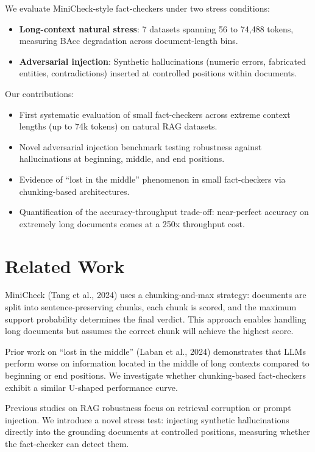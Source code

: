 \documentclass{article}
\begin{document}
We evaluate MiniCheck-style fact-checkers under two stress conditions:
\begin{itemize}
    \item \textbf{Long-context natural stress}: 7 datasets spanning 56 to 74,488 tokens, measuring BAcc degradation across document-length bins.
    \item \textbf{Adversarial injection}: Synthetic hallucinations (numeric errors, fabricated entities, contradictions) inserted at controlled positions within documents.
\end{itemize}

Our contributions:
\begin{itemize}
    \item First systematic evaluation of small fact-checkers across extreme context lengths (up to 74k tokens) on natural RAG datasets.
    \item Novel adversarial injection benchmark testing robustness against hallucinations at beginning, middle, and end positions.
    \item Evidence of ``lost in the middle'' phenomenon in small fact-checkers via chunking-based architectures.
    \item Quantification of the accuracy-throughput trade-off: near-perfect accuracy on extremely long documents comes at a 250x throughput cost.
\end{itemize}

\section{Related Work}

MiniCheck (Tang et al., 2024) uses a chunking-and-max strategy: documents are split into sentence-preserving chunks, each chunk is scored, and the maximum support probability determines the final verdict. This approach enables handling long documents but assumes the correct chunk will achieve the highest score.

Prior work on ``lost in the middle'' (Laban et al., 2024) demonstrates that LLMs perform worse on information located in the middle of long contexts compared to beginning or end positions. We investigate whether chunking-based fact-checkers exhibit a similar U-shaped performance curve.

Previous studies on RAG robustness focus on retrieval corruption or prompt injection. We introduce a novel stress test: injecting synthetic hallucinations directly into the grounding documents at controlled positions, measuring whether the fact-checker can detect them.
\end{document}
